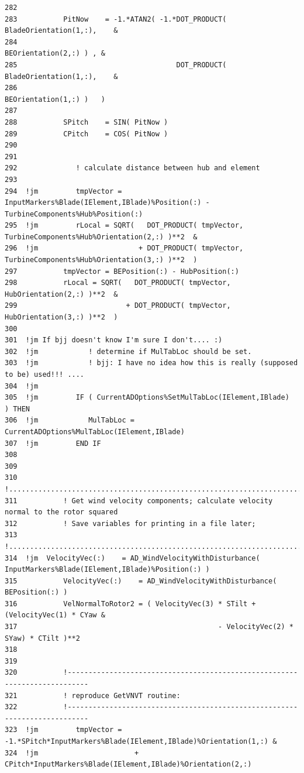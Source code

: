 \documentclass[11pt]{article}
\begin{document}
{\begin{verbatim}
282  
283           PitNow    = -1.*ATAN2( -1.*DOT_PRODUCT( BladeOrientation(1,:),    &
284                                                   BEOrientation(2,:) ) , &
285                                      DOT_PRODUCT( BladeOrientation(1,:),    &
286                                                   BEOrientation(1,:) )   )
287                      
288           SPitch    = SIN( PitNow )
289           CPitch    = COS( PitNow )
290  
291           
292              ! calculate distance between hub and element
293              
294  !jm         tmpVector = InputMarkers%Blade(IElement,IBlade)%Position(:) - TurbineComponents%Hub%Position(:)
295  !jm         rLocal = SQRT(   DOT_PRODUCT( tmpVector, TurbineComponents%Hub%Orientation(2,:) )**2  &
296  !jm                        + DOT_PRODUCT( tmpVector, TurbineComponents%Hub%Orientation(3,:) )**2  )
297           tmpVector = BEPosition(:) - HubPosition(:)
298           rLocal = SQRT(   DOT_PRODUCT( tmpVector, HubOrientation(2,:) )**2  &
299                          + DOT_PRODUCT( tmpVector, HubOrientation(3,:) )**2  )
300  
301  !jm If bjj doesn't know I'm sure I don't.... :)
302  !jm            ! determine if MulTabLoc should be set.  
303  !jm            ! bjj: I have no idea how this is really (supposed to be) used!!! .... 
304  !jm            
305  !jm         IF ( CurrentADOptions%SetMulTabLoc(IElement,IBlade)  ) THEN
306  !jm            MulTabLoc = CurrentADOptions%MulTabLoc(IElement,IBlade)
307  !jm         END IF
308           
309  
310           !...........................................................................
311           ! Get wind velocity components; calculate velocity normal to the rotor squared
312           ! Save variables for printing in a file later;
313           !...........................................................................
314  !jm  VelocityVec(:)    = AD_WindVelocityWithDisturbance( InputMarkers%Blade(IElement,IBlade)%Position(:) )
315           VelocityVec(:)    = AD_WindVelocityWithDisturbance( BEPosition(:) )
316           VelNormalToRotor2 = ( VelocityVec(3) * STilt + (VelocityVec(1) * CYaw &
317                                                - VelocityVec(2) * SYaw) * CTilt )**2
318  
319  
320           !---------------------------------------------------------------------------
321           ! reproduce GetVNVT routine:
322           !---------------------------------------------------------------------------
323  !jm         tmpVector =  -1.*SPitch*InputMarkers%Blade(IElement,IBlade)%Orientation(1,:) &
324  !jm                       + CPitch*InputMarkers%Blade(IElement,IBlade)%Orientation(2,:)

\end{verbatim}}
\end{document}

